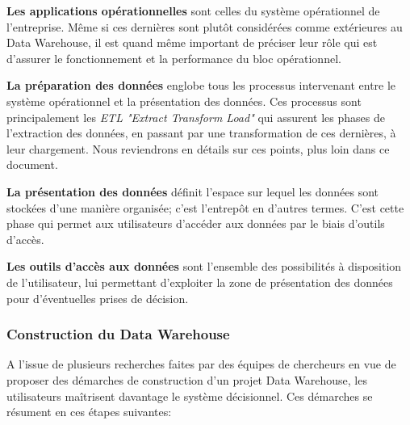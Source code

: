 \documentclass[12pt,a4wide,twoside]{report}
\begin{document}
 
\textbf{Les applications opérationnelles} sont celles du système opérationnel de l'entreprise. Même si ces dernières sont plutôt considérées comme extérieures au Data Warehouse, il est quand même important de préciser leur rôle qui est d'assurer le fonctionnement et la performance du bloc opérationnel.


\textbf{La préparation des données} englobe tous les processus intervenant entre le système opérationnel et la présentation des données. Ces processus sont principalement les \emph{ETL "Extract Transform Load"} qui assurent les phases de l'extraction des données, en passant par une transformation de ces dernières, à leur chargement. Nous reviendrons en détails sur ces points, plus loin dans ce document.


\textbf{La présentation des données} définit l'espace sur lequel les données sont stockées d'une manière organisée; c'est l'entrepôt en d'autres termes.\newline
C'est cette phase qui permet aux utilisateurs d'accéder aux données par le biais d'outils d'accès.


\textbf{Les outils d'accès aux données} sont l'ensemble des possibilités à disposition de l'utilisateur, lui permettant d'exploiter la zone de présentation des données pour d'éventuelles prises de décision.


\subsubsection{Construction du Data Warehouse}
A l'issue de plusieurs recherches faites par des équipes de chercheurs en vue de proposer des démarches de construction d'un projet Data Warehouse, les utilisateurs maîtrisent davantage le système décisionnel. Ces démarches se résument en ces étapes suivantes:
\end{document}
